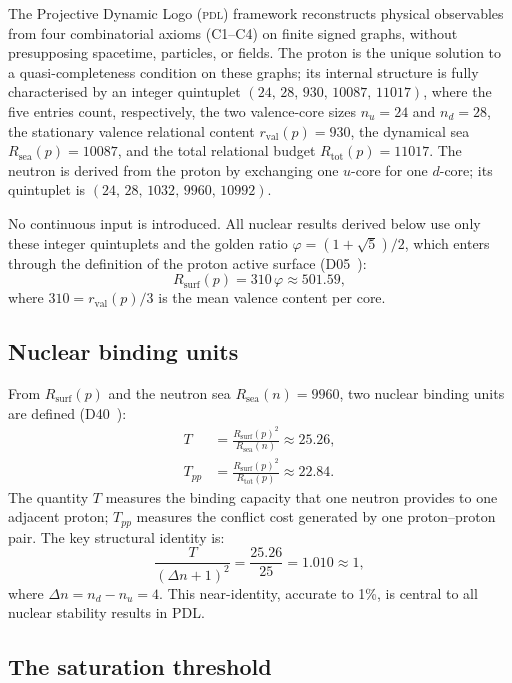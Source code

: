 \documentclass[11pt,a4paper]{article}
\theoremstyle{definition}
\theoremstyle{remark}
\newcommand{\PDL}{\textsc{pdl}}
\newcommand{\Rsurf}{R_{\mathrm{surf}}}
\newcommand{\Rsea}{R_{\mathrm{sea}}}
\newcommand{\Rtot}{R_{\mathrm{tot}}}
\newcommand{\rval}{r_{\mathrm{val}}}
\newcommand{\Dn}{\Delta n}
\newcommand{\nuu}{n_u}
\newcommand{\ndd}{n_d}
\newcommand{\protonq}{(24,\,28,\,930,\,10087,\,11017)}
\newcommand{\neutronq}{(24,\,28,\,1032,\,9960,\,10992)}
\newcommand{\vp}{\varphi}
\newcommand{\Tpdl}{T}
\newcommand{\Tpp}{T_{pp}}
\begin{document}
The Projective Dynamic Logo (\PDL) framework reconstructs physical observables from four combinatorial axioms (C1--C4) on finite signed graphs, without presupposing spacetime, particles, or fields. The proton is the unique solution to a quasi-completeness condition on these graphs; its internal structure is fully characterised by an integer quintuplet $\protonq$, where the five entries count, respectively, the two valence-core sizes $\nuu = 24$ and $\ndd = 28$, the stationary valence relational content $\rval(p) = 930$, the dynamical sea $\Rsea(p) = 10087$, and the total relational budget $\Rtot(p) = 11017$. The neutron is derived from the proton by exchanging one $u$-core for one $d$-core; its quintuplet is $\neutronq$.

No continuous input is introduced. All nuclear results derived below use only these integer quintuplets and the golden ratio $\vp = (1+\sqrt{5})/2$, which enters through the definition of the proton active surface (D05~\cite{PDL_D05}):
\begin{equation}
  \Rsurf(p) = 310\,\vp \approx 501.59,
  \label{eq:Rsurf}
\end{equation}
where $310 = \rval(p)/3$ is the mean valence content per core.

\subsection{Nuclear binding units}
\label{subsec:binding}

From $\Rsurf(p)$ and the neutron sea $\Rsea(n) = 9960$, two nuclear binding units are defined (D40~\cite{PDL_D40}):
\begin{align}
  \Tpdl &= \frac{\Rsurf(p)^2}{\Rsea(n)} \approx 25.26, \label{eq:T} \\
  \Tpp  &= \frac{\Rsurf(p)^2}{\Rtot(p)} \approx 22.84. \label{eq:Tpp}
\end{align}
The quantity $\Tpdl$ measures the binding capacity that one neutron provides to one adjacent proton; $\Tpp$ measures the conflict cost generated by one proton--proton pair. The key structural identity is:
\begin{equation}
  \frac{\Tpdl}{(\Dn+1)^2} = \frac{25.26}{25} = 1.010 \approx 1,
  \label{eq:Tident}
\end{equation}
where $\Dn = \ndd - \nuu = 4$. This near-identity, accurate to 1\%, is central to all nuclear stability results in PDL.

\subsection{The saturation threshold}
\label{subsec:Zsat}
\end{document}
